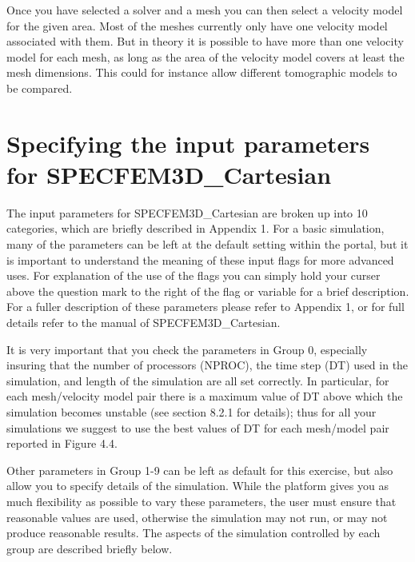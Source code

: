 \documentclass[english]{book}
\begin{document}
Once you have selected a solver and a mesh you can then select a
velocity model for the given area. Most of the meshes currently only
have one velocity model associated with them. But in theory it is
possible to have more than one velocity model for each mesh, as long as
the area of the velocity model covers at least the mesh dimensions. This
could for instance allow different tomographic models to be compared.


\section{Specifying the input parameters for SPECFEM3D\_Cartesian}
\label{\detokenize{Section5:specifying-the-input-parameters-for-specfem3d-cartesian}}
The input parameters for SPECFEM3D\_Cartesian are broken up into 10
categories, which are briefly described in Appendix 1. For a basic
simulation, many of the parameters can be left at the default setting
within the portal, but it is important to understand the meaning of
these input flags for more advanced uses. For explanation of the use of
the flags you can simply hold your curser above the question mark to the
right of the flag or variable for a brief description. For a fuller
description of these parameters please refer to Appendix 1, or for full
details refer to the manual of SPECFEM3D\_Cartesian.

It is very important that you check the parameters in Group 0,
especially insuring that the number of processors (NPROC), the time step
(DT) used in the simulation, and length of the simulation are all set
correctly. In particular, for each mesh/velocity model pair there is a
maximum value of DT above which the simulation becomes unstable (see
section 8.2.1 for details); thus for all your simulations we suggest to
use the best values of DT for each mesh/model pair reported in Figure
4.4.

Other parameters in Group 1-9 can be left as default for this exercise,
but also allow you to specify details of the simulation. While the
platform gives you as much flexibility as possible to vary these
parameters, the user must ensure that reasonable values are used,
otherwise the simulation may not run, or may not produce reasonable
results. The aspects of the simulation controlled by each group are
described briefly below.
\end{document}
